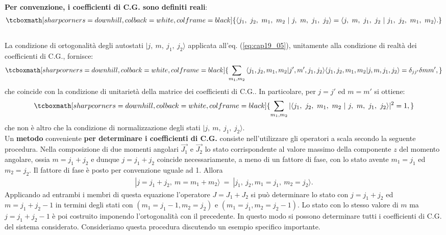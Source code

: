 \textbf{Per convenzione, i coefficienti di C.G. sono definiti reali}:
	\begin{align}
		\tcboxmath[sharp corners=downhill, colback=white, colframe=black]{
			\langle j_1 ,~ j_2,~m_1, ~ m_2~ |~ j ,~ m,~j_1, ~ j_2 \rangle  = \langle j ,~ m,~j_1, ~ j_2~ |~ j_1 ,~ j_2,~m_1, ~ m_2 \rangle .
			}
	\end{align}\\
	
La condizione di ortogonalità degli autostati $\mid j ,~ m,~j_1, ~ j_2 \rangle $ applicata all'eq. (\ref{eq:cap19_05}), unitamente alla condizione di realtà dei coefficienti di C.G., fornisce:
	\begin{equation}
		\tcboxmath[sharp corners=downhill, colback=white, colframe=black]{
			\sum_{m_1, m_2} {\langle j_1 , j_2, m_1, m_2 | j' , m', j_1, j_2 \rangle  \langle j_1 , j_2, m_1, m_2  | j , m, j_1, j_2 \rangle } = \delta_{j j'} \delta{m m'},
			}
	\end{equation}
che coincide con la condizione di unitarietà della matrice dei coefficienti di C.G.. In particolare, per $j=j'$ ed $m=m'$ si ottiene:
	\begin{equation}
		\tcboxmath[sharp corners=downhill, colback=white, colframe=black]{
			\sum_{m_1, m_2} {|\langle j_1 ,~ j_2,~m_1, ~ m_2 ~|~ j ,~ m,~j_1, ~ j_2 \rangle|^2} =1 ,
			}
	\end{equation}
che non è altro che la condizione di normalizzazione degli stati $| j ,~ m,~j_1, ~ j_2 \rangle $. \\

Un \textbf{metodo} conveniente \textbf{per determinare i coefficienti di C.G.} consiste nell'utilizzare gli operatori a scala secondo la seguente procedura. Nella composizione di due momenti angolari $\vec{J_1}$ e  $\vec{J_2}$ lo stato corrispondente al valore massimo della componente $z$ del momento angolare, ossia $m= j_1+j_2$ e dunque $j=j_1+j_2$ coincide necessariamente, a meno di un fattore di fase, con lo stato avente $m_1=j_1$ ed $m_2=j_2$. Il fattore di fase è posto per convenzione uguale ad 1. Allora
	\begin{align}
		| j= j_1 + j_2 ,~m= m_1 +m_2  \rangle ~= ~| j_1 ,~j_2,  m_1=j_1, ~m_2= j_2 \rangle .
	\end{align}
Applicando ad entrambi i membri di questa equazione l'operatore $J=J_1+J_2$ si può determinare lo stato con $j=j_1+j_2$ ed $m=j_1+j_2-1$ in termini degli stati con $(m_1=j_1-1 , m_2=j_2)$ e $(m_1=j_1, m_2=j_2-1)$. Lo stato con lo stesso valore di $m$ ma $j=j_1+j_2-1$ è poi costruito imponendo l'ortogonalità con il precedente. In questo modo si possono determinare tutti i coefficienti di C.G. del sistema considerato. Consideriamo questa procedura discutendo un esempio specifico importante.
